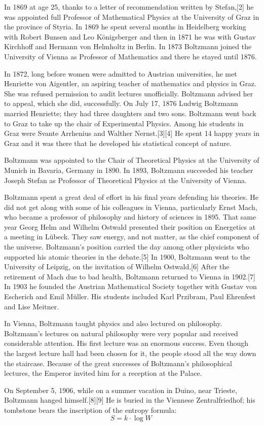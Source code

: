 In 1869 at age 25, thanks to a letter of recommendation written by Stefan,[2] he was appointed full Professor of Mathematical Physics at the University of Graz in the province of Styria. In 1869 he spent several months in Heidelberg working with Robert Bunsen and Leo Königsberger and then in 1871 he was with Gustav Kirchhoff and Hermann von Helmholtz in Berlin. In 1873 Boltzmann joined the University of Vienna as Professor of Mathematics and there he stayed until 1876.

In 1872, long before women were admitted to Austrian universities, he met Henriette von Aigentler, an aspiring teacher of mathematics and physics in Graz. She was refused permission to audit lectures unofficially. Boltzmann advised her to appeal, which she did, successfully. On July 17, 1876 Ludwig Boltzmann married Henriette; they had three daughters and two sons. Boltzmann went back to Graz to take up the chair of Experimental Physics. Among his students in Graz were Svante Arrhenius and Walther Nernst.[3][4] He spent 14 happy years in Graz and it was there that he developed his statistical concept of nature.

Boltzmann was appointed to the Chair of Theoretical Physics at the University of Munich in Bavaria, Germany in 1890. In 1893, Boltzmann succeeded his teacher Joseph Stefan as Professor of Theoretical Physics at the University of Vienna.

Boltzmann spent a great deal of effort in his final years defending his theories. He did not get along with some of his colleagues in Vienna, particularly Ernst Mach, who became a professor of philosophy and history of sciences in 1895. That same year Georg Helm and Wilhelm Ostwald presented their position on Energetics at a meeting in Lübeck. They saw energy, and not matter, as the chief component of the universe. Boltzmann's position carried the day among other physicists who supported his atomic theories in the debate.[5] In 1900, Boltzmann went to the University of Leipzig, on the invitation of Wilhelm Ostwald.[6] After the retirement of Mach due to bad health, Boltzmann returned to Vienna in 1902.[7] In 1903 he founded the Austrian Mathematical Society together with Gustav von Escherich and Emil Müller. His students included Karl Przibram, Paul Ehrenfest and Lise Meitner.

In Vienna, Boltzmann taught physics and also lectured on philosophy. Boltzmann's lectures on natural philosophy were very popular and received considerable attention. His first lecture was an enormous success. Even though the largest lecture hall had been chosen for it, the people stood all the way down the staircase. Because of the great successes of Boltzmann's philosophical lectures, the Emperor invited him for a reception at the Palace.

On September 5, 1906, while on a summer vacation in Duino, near Trieste, Boltzmann hanged himself.[8][9] He is buried in the Viennese Zentralfriedhof; his tombstone bears the inscription of the entropy formula:
\begin{equation}
	S=k\cdot \log W\,
\end{equation}
